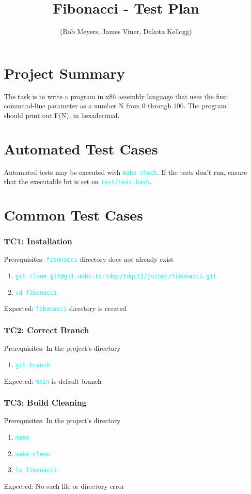 \documentclass{article}
\title{Fibonacci - Test Plan}
\author{(Rob Meyers, James Viner, Dakota Kellogg)}
\date{}
\newcommand{\code}[1]{\textcolor{cyan}{\texttt{#1}}}
\begin{document}
\maketitle

\section*{Project Summary}
The task is to write a program in x86 assembly language that uses the
first command-line parameter as a number N from 0 through 100. The
program should print out F(N), in hexadecimal.




\section*{Automated Test Cases}
Automated tests may be executed with \code{make check}.
If the tests don't run, ensure that the executable bit is set on
\code{test/test.bash}.



\section*{Common Test Cases}

\subsubsection{TC1: Installation}
Prerequisites: \code{fibonacci} directory does not already exist
\begin{enumerate}
	\item \code{git clone git@git.umbc.tc:tdqc/tdqc12/jviner/fibonacci.git}
	\item \code{cd fibonacci}
\end{enumerate}
Expected: \code{fibonacci} directory is created


\subsubsection{TC2: Correct Branch}
Prerequisites: In the project's directory
\begin{enumerate}
	\item \code{git branch}
\end{enumerate}
Expected: \code{main} is default branch


\subsubsection{TC3: Build Cleaning}
Prerequisites: In the project's directory
\begin{enumerate}
	\item \code{make}
	\item \code{make clean}
	\item \code{ls fibonacci}
\end{enumerate}
Expected: No such file or directory error
\end{document}
